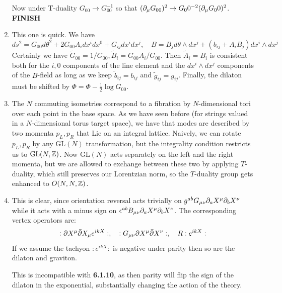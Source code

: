 \documentclass[11pt, class=article, crop=false]{standalone}
\begin{document}
\begin{enumerate}
	Now under T-duality $G_{00} \to G_{00}^{-1}$ so that $(\partial_\mu G_{00})^2 \to G_00^{-2} (\partial_\mu G_00)^2$. \textbf{FINISH}
	
	
	\item This one is quick. We have
	\[
		ds^2 = G_{00} d\theta^2 + 2 G_{00} A_{i} dx^i dx^0 + G_{ij} dx^i dx^j, \quad B = B_j d\theta \wedge dx^j + (b_{ij} + A_i B_j) dx^i \wedge dx^j
	\]
	Certainly we have $\tilde G_{00} = 1/G_{00}, \tilde B_i = G_{00} A_i/G_{00}$. Then $\tilde A_i = B_i$ is consistent both for the $i,0$ components of the line element and the $dx^i \wedge dx^j$ components of the $B$-field as long as we keep $\tilde b_{ij} = b_{ij}$ and $\tilde g_{ij} = g_{ij}$. Finally, the dilaton must be shifted by $\Phi = \Phi - \frac12 \log G_{00}$. 
	
	\item The $N$ commuting isometries correspond to a fibration by $N$-dimensional tori over each point in the base space. As we have seen before (for strings valued in a $N$-dimensional torus target space), we have that modes are described by two momenta $p_L, p_R$ that Lie on an integral lattice. Naively, we can rotate $p_L, p_R$ by any $\mathrm{GL}(N)$ transformation, but the integrality condition restricts us to $\mathrm{GL}(N, \mathbb{Z})$. Now $\mathrm{GL}(N)$ acts separately on the left and the right momenta, but we are allowed to exchange between these two by applying $T$-duality, which still preserves our Lorentzian norm, so the $T$-duality group gets enhanced to $O(N, N, \mathbb{Z})$.
	
	\item This is clear, since orientation reversal acts trivially on $g^{ab} G_{\mu \nu} \partial_a X^\mu \partial_b X^\nu$ while it acts with a minus sign on $\epsilon^{ab} B_{\mu \nu} \partial_a X^\mu \partial_b X^\nu$. The corresponding vertex operators are:
	\[
		:\partial X^\mu \bar {\partial} X_\mu e^{i k X}:, \quad   :G_{\mu \nu} \partial X^{\mu} \bar {\partial} X^\nu:, \quad R :e^{i k X}:
	\]
	If we assume the tachyon $:e^{i k X}:$ is negative under parity then so are the dilaton and graviton. 
	
	This is incompatible with \textbf{6.1.10}, as then parity will flip the sign of the dilaton in the exponential, substantially changing the action of the theory. 
	
\end{enumerate}

\end{document}

